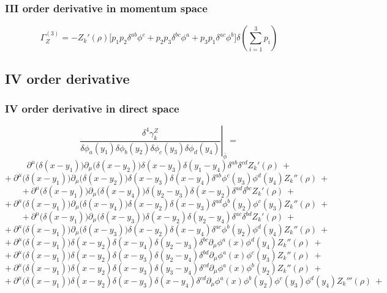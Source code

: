 \subsubsection{III order derivative in momentum space}
\begin{equation}\label{Z3}
\Gamma_Z^{(3)} = - Z_k'(\rho)\big[p_1p_2\delta^{ab}\phi^c + p_2p_3\delta^{bc}\phi^a + p_3p_1\delta^{ac}\phi^b\big] \delta\left(\sum_{i=1}^3 p_i\right)
\end{equation}


\subsection{IV order derivative}
\subsubsection{IV order derivative in direct space}
\begin{equation}
\left. \frac{\delta^4 \gamma_k^{Z}}{\delta \phi_a(y_1)\delta \phi_b(y_2)\delta \phi_c(y_3)\delta \phi_d(y_4)}\right|_{\bar{\phi}} = 
\end{equation}
$$ \partial^\mu\big(\delta(x - y_1)\big)\partial_\mu\big(\delta(x-y_2)\big)\delta(x - y_3)\delta(y_1 - y_4)\delta^{ab}\delta^{cd} Z_k'(\rho)\ +$$
$$+\ \partial^\mu\big(\delta(x - y_1)\big)\partial_\mu\big(\delta(x-y_2)\big)\delta(x - y_3)\delta(x - y_4)\delta^{ab}\phi^{c}(y_3)\phi^{d}(y_4) Z_k''(\rho)\ +$$
$$+\ \partial^\mu\big(\delta(x - y_1)\big)\partial_\mu\big(\delta(x-y_4)\big)\delta(y_2 - y_3)\delta(x - y_2)\delta^{ad}\delta^{bc} Z_k'(\rho)\ +$$
$$+\ \partial^\mu\big(\delta(x - y_1)\big)\partial_\mu\big(\delta(x-y_4)\big)\delta(x - y_2)\delta(x - y_3)\delta^{ad}\phi^{b}(y_2)\phi^{c}(y_3) Z_k''(\rho)\ +$$
$$+\ \partial^\mu\big(\delta(x - y_1)\big)\partial_\mu\big(\delta(x-y_3)\big)\delta(x - y_2)\delta(y_2 - y_4)\delta^{ac}\delta^{bd} Z_k'(\rho)\ +$$
$$+\ \partial^\mu\big(\delta(x - y_1)\big)\partial_\mu\big(\delta(x-y_3)\big)\delta(x - y_2)\delta(x - y_4)\delta^{ac}\phi^{b}(y_2)\phi^{d}(y_4) Z_k''(\rho)\ +$$
$$+\ \partial^\mu\big(\delta(x - y_1)\big)\delta(x-y_2)\delta(x - y_4)\delta(y_2 - y_3)\delta^{bc}\partial_\mu\phi^{a}(x)\phi^{d}(y_4) Z_k''(\rho)\ +$$
$$+\ \partial^\mu\big(\delta(x - y_1)\big)\delta(x-y_2)\delta(x - y_3)\delta(y_2 - y_4)\delta^{bd}\partial_\mu\phi^{a}(x)\phi^{c}(y_3) Z_k''(\rho)\ +$$
$$+\ \partial^\mu\big(\delta(x - y_1)\big)\delta(x-y_2)\delta(x - y_3)\delta(y_3 - y_4)\delta^{cd}\partial_\mu\phi^{a}(x)\phi^{b}(y_2) Z_k''(\rho)\ +$$
$$+\ \partial^\mu\big(\delta(x - y_1)\big)\delta(x-y_2)\delta(x - y_3)\delta(x - y_4)\delta^{cd}\partial_\mu\phi^{a}(x)\phi^{b}(y_2)\phi^{c}(y_3)\phi^{d}(y_4)Z_k'''(\rho)\ +$$
